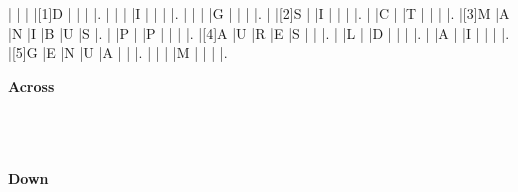 \documentclass{article}
\begin{document}
\begin{Puzzle}{7}{12}
|{} |{} |{} |[1]D |{} |{} |{} |.
|{} |{} |{} |I |{} |{} |{} |.
|{} |{} |{} |G |{} |{} |{} |.
|{} |[2]S |{} |I |{} |{} |{} |.
|{} |C |{} |T |{} |{} |{} |.
|[3]M |A |N |I |B |U |S |.
|{} |P |{} |P |{} |{} |{} |.
|[4]A |U |R |E |S |{} |{} |.
|{} |L |{} |D |{} |{} |{} |.
|{} |A |{} |I |{} |{} |{} |.
|[5]G |E |N |U |A |{} |{} |.
|{} |{} |{} |M |{} |{} |{} |.
\end{Puzzle}

\begin{PuzzleClues}{\textbf{Across}}\\
\\
\\
\\
\end{PuzzleClues}%
\begin{PuzzleClues}{\textbf{Down}}\\
\\
\\
\end{PuzzleClues}
\end{document}
